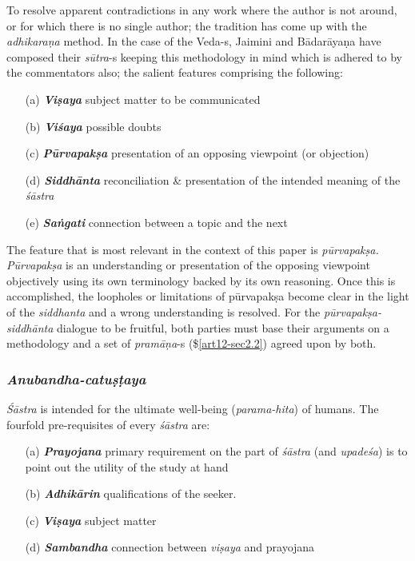 To resolve apparent contradictions in any work where the author is not around, or for which there is no single author; the tradition has come up with the {\sl adhikaraṇa} method. In the case of the Veda-s, Jaimini and Bādarāyaṇa have composed their {\sl sūtra}-s keeping this methodology in mind which is adhered to by the commentators also; the salient features comprising the following:
\begin{itemize}
\item[(a)] {{\sl\bfseries Viṣaya}\relax} subject matter to be communicated

\item[(b)] {{\sl\bfseries Viśaya}\relax} possible doubts

\item[(c)] {{\sl\bfseries Pūrvapakṣa}\relax} presentation of an opposing viewpoint (or objection)

\item[(d)] {{\sl\bfseries Siddhānta}\relax} reconciliation \& presentation of the intended meaning of the {\sl śāstra}

\item[(e)] {{\sl\bfseries Saṅgati}\relax} connection between a topic and the next 
\end{itemize}

The feature that is most relevant in the context of this paper is {\sl pūrvapakṣa. Pūrvapakṣa} is an understanding or presentation of the opposing viewpoint objectively using its own terminology backed by its own reasoning. Once this is accomplished, the loopholes or limitations of pūrvapakṣa become clear in the light of the {\sl siddhanta} and a wrong understanding is resolved. For the {\sl pūrvapakṣa-siddhānta} dialogue to be fruitful, both parties must base their arguments on a methodology and a set of {\sl pramāṇa}-s (\$\ref{art12-sec2.2}) agreed upon by both. 

\subsubsection{{\sl\bfseries Anubandha-catuṣṭaya}}\label{art12-sec2.5.4}

{\sl Śāstra} is intended for the ultimate well-being ({\sl parama-hita}) of humans. The fourfold pre-requisites of every {\sl śāstra} are:
\begin{itemize}
\item[(a)] {{\sl\bfseries Prayojana}\relax} primary requirement on the part of {\sl śāstra} (and {\sl upadeśa}) is to point out the utility of the study at hand

\item[(b)] {{\sl\bfseries Adhikārin}\relax} qualiﬁcations of the seeker.

\item[(c)] {{\sl\bfseries Viṣaya}\relax} subject matter

\item[(d)] {{\sl\bfseries Sambandha}\relax} connection between {\sl viṣaya} and prayojana
\end{itemize}

